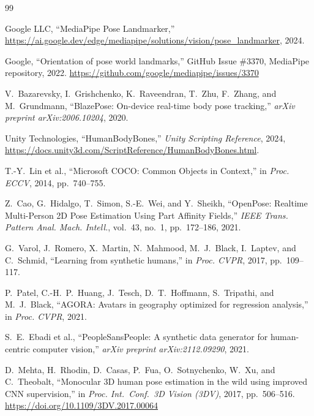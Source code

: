 \documentclass[twocolumn]{article}
\begin{document}
\begin{thebibliography}{99}

Google LLC, ``MediaPipe Pose Landmarker,''
\url{https://ai.google.dev/edge/mediapipe/solutions/vision/pose_landmarker},
2024.

Google, ``Orientation of pose world landmarks,''
GitHub Issue \#3370, MediaPipe repository, 2022.
\url{https://github.com/google/mediapipe/issues/3370}

V.~Bazarevsky, I.~Grishchenko, K.~Raveendran, T.~Zhu, F.~Zhang,
and M.~Grundmann,
``BlazePose: On-device real-time body pose tracking,''
\textit{arXiv preprint arXiv:2006.10204}, 2020.

Unity Technologies, ``HumanBodyBones,''
\textit{Unity Scripting Reference}, 2024,
\url{https://docs.unity3d.com/ScriptReference/HumanBodyBones.html}.

T.-Y.~Lin et al.,
``Microsoft COCO: Common Objects in Context,''
in \textit{Proc. ECCV}, 2014, pp.~740--755.

Z.~Cao, G.~Hidalgo, T.~Simon, S.-E.~Wei, and Y.~Sheikh,
``OpenPose: Realtime Multi-Person 2D Pose Estimation Using Part Affinity
Fields,''
\textit{IEEE Trans. Pattern Anal. Mach. Intell.}, vol.~43, no.~1,
pp.~172--186, 2021.

G.~Varol, J.~Romero, X.~Martin, N.~Mahmood, M.~J.~Black, I.~Laptev,
and C.~Schmid,
``Learning from synthetic humans,''
in \textit{Proc. CVPR}, 2017, pp.~109--117.

P.~Patel, C.-H.~P.~Huang, J.~Tesch, D.~T.~Hoffmann, S.~Tripathi,
and M.~J.~Black,
``AGORA: Avatars in geography optimized for regression analysis,''
in \textit{Proc. CVPR}, 2021.

S.~E.~Ebadi et al.,
``PeopleSansPeople: A synthetic data generator for human-centric
computer vision,''
\textit{arXiv preprint arXiv:2112.09290}, 2021.

D.~Mehta, H.~Rhodin, D.~Casas, P.~Fua, O.~Sotnychenko, W.~Xu,
and C.~Theobalt,
``Monocular 3D human pose estimation in the wild using improved CNN
supervision,''
in \textit{Proc. Int.\ Conf.\ 3D Vision (3DV)}, 2017, pp.~506--516.
\url{https://doi.org/10.1109/3DV.2017.00064}


\end{thebibliography}
\end{document}
